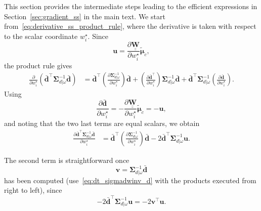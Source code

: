 \documentclass[12pt]{article}
\newcommand{\mybcirc}[1] {\underline{\underline{\bm{#1}}}}
\begin{document}
This section provides the intermediate steps leading to the efficient expressions in Section~\ref{sec:gradient_ss} in the main text. We start from~\eqref{eq:derivative_ss_product_rule}, where the derivative is taken with respect to the scalar coordinate $w_i^\star$. Since
\begin{equation}
    \bm{u}=
    \frac{\partial \mybcirc{W}}{\partial w_i^\star}
    \tilde{\bm{\mu}}_c,
\end{equation}
the product rule gives
\begin{equation}
\begin{split}
    \frac{\partial}{\partial w_i^\star}
    \left(
        \bar{\bm{d}}^{\top}
        \bm{\Sigma}_{d|\omega}^{-1}
        \bar{\bm{d}}
    \right)
    &=
    \bar{\bm{d}}^{\top}
    \left(
        \frac{\partial \bm{\Sigma}_{d|\omega}^{-1}}
        {\partial w_i^\star}
    \right)
    \bar{\bm{d}}
    +
    \left(
        \frac{\partial \bar{\bm{d}}^{\top}}
        {\partial w_i^\star}
    \right)
    \bm{\Sigma}_{d|\omega}^{-1}
    \bar{\bm{d}}
    +
    \bar{\bm{d}}^{\top}
    \bm{\Sigma}_{d|\omega}^{-1}
    \left(
        \frac{\partial \bar{\bm{d}}}
        {\partial w_i^\star}
    \right).
\end{split}
\end{equation}
Using
\begin{equation}
    \frac{\partial \bar{\bm{d}}}
    {\partial w_i^\star}
    =
    -\frac{\partial \mybcirc{W}}
    {\partial w_i^\star}
    \tilde{\bm{\mu}}_c
    =-\bm{u},
\end{equation}
and noting that the two last terms are equal scalars, we obtain
\begin{equation}
\begin{split}
    \frac{\partial \bar{\bm{d}}^{\top}
    \bm{\Sigma}_{d|\omega}^{-1}
    \bar{\bm{d}}}
    {\partial w_i^\star}
    &=
    \bar{\bm{d}}^{\top}
    \left(
        \frac{\partial \bm{\Sigma}_{d|\omega}^{-1}}
        {\partial w_i^\star}
    \right)
    \bar{\bm{d}}
    -2
    \bar{\bm{d}}^{\top}
    \bm{\Sigma}_{d|\omega}^{-1}
    \bm{u}.
\end{split}
\end{equation}

The second term is straightforward once
\begin{equation}
    \bm{v}
    =
    \bm{\Sigma}_{d|\omega}^{-1}
    \bar{\bm{d}}
\end{equation}
has been computed (use~\eqref{eq:dt_sigmadwinv_d} with the products executed from right to left), since
\begin{equation}
    -2
    \bar{\bm{d}}^{\top}
    \bm{\Sigma}_{d|\omega}^{-1}
    \bm{u}
    =
    -2
    \bm{v}^{\top}
    \bm{u}.
\end{equation}
\end{document}
